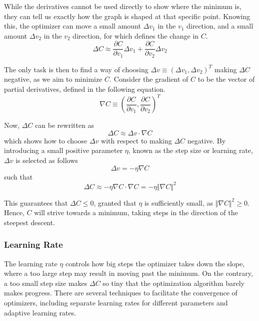     While the derivatives cannot be used directly to show where the minimum is, they can tell us exactly how the graph is shaped at that specific point. 
    Knowing this, the optimizer can move a small amount $\Delta v_1$ in the $v_1$ direction, and a small amount $\Delta v_2$ in the $v_2$ direction, for which  defines the change in $C$.
    \begin{equation}\label{eq:mopt-DeltaC}
        \Delta C \approx \frac{\partial C}{\partial v_1}\Delta v_1 + \frac{\partial C}{\partial v_2} \Delta v_2
    \end{equation}
    
    The only task is then to find a way of choosing $\Delta v\equiv (\Delta v_1, \Delta v_2)^T$ making $\Delta C$ negative, as we aim to minimize $C$. Consider the gradient of $C$ to be the vector of partial derivatives, defined in the following equation.
    \begin{equation}\label{eq:mopt-gradient}
        \nabla C \equiv \left(\frac{\partial C}{\partial v_1}, \frac{\partial C}{\partial v_2}\right)^T
    \end{equation}
    
    Now, $\Delta C$ can be rewritten as
    \begin{equation}\label{eq:mopt-DeltaC-gradient}
        \Delta C \approx \Delta v \cdot \nabla C
    \end{equation}
    which shows how to choose $\Delta v$ with respect to making $\Delta C$ negative. By introducing a small positive parameter $\eta$, known as the step size or learning rate, $\Delta v$ is selected as follows
    \begin{equation}
        \Delta v = -\eta \nabla C
    \end{equation}
    such that 
    \begin{equation}
        \Delta C \approx -\eta \nabla C \cdot \nabla C = -\eta \Vert\nabla C\Vert^2
    \end{equation}
    
    This guarantees that $\Delta C \leq 0$, granted that $\eta$ is sufficiently small, as $\Vert\nabla C\Vert^2 \geq 0$. Hence, $C$ will strive towards a minimum, taking steps in the direction of the steepest descent.
    
    \subsubsection{Learning Rate}
    
        The learning rate $\eta$ controls how big steps the optimizer takes down the slope, where a too large step may result in moving past the minimum. On the contrary, a too small step size makes $\Delta C$ so tiny that the optimization algorithm barely makes progress. There are several techniques to facilitate the convergence of optimizers, including separate learning rates for different parameters and adaptive learning rates.
        
